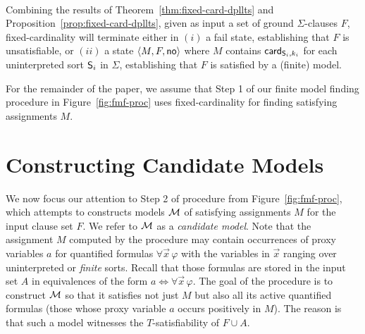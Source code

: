 \documentclass{svjour3}                     %
\begin{document}
\ 

Combining the results of Theorem~\ref{thm:fixed-card-dpllts} and Proposition~\ref{prop:fixed-card-dpllts},
given as input a set of ground $\Sigma$-clauses $F$,
fixed-cardinality \checkfcc will terminate either in 
$(i)$ a fail state, establishing that $F$ is unsatisfiable, or
$(ii)$ a state $\state{M,F,\none}$ where $M$ contains $\card[ \So_i, k_i ]$ for each uninterpreted sort $\So_i$ in $\Sigma$,
establishing that $F$ is satisfied by a (finite) model.

For the remainder of the paper, we assume that
Step 1 of our finite model finding procedure in Figure~\ref{fig:fmf-proc}
uses fixed-cardinality \checkfcc for finding satisfying assignments $M$.


\section{Constructing Candidate Models}
\label{sec:fmf-model-construct}

We now focus our attention to Step 2 of procedure \fmsolve from Figure~\ref{fig:fmf-proc}, 
which attempts to constructs models $\M$ of satisfying assignments $M$ 
for the input clause set $F$.
We refer to $\M$ as a \emph{candidate model}.
Note that the assignment $M$ computed by the procedure may contain occurrences
of proxy variables $a$ for quantified formulas $\forall \vec x\, \varphi$
with the variables in $\vec x$ ranging over uninterpreted or \emph{finite} sorts.
Recall that those formulas are stored in the input set $A$ 
in equivalences of the form $a \Leftrightarrow \forall \vec x\, \varphi$.
The goal of the procedure is to construct $\M$ so that it satisfies 
not just $M$ but also all its active quantified formulas
(those whose proxy variable $a$ occurs positively in $M$).
The reason is that such a model witnesses the $T$-satisfiability of
$F \cup A$.%
\end{document}
